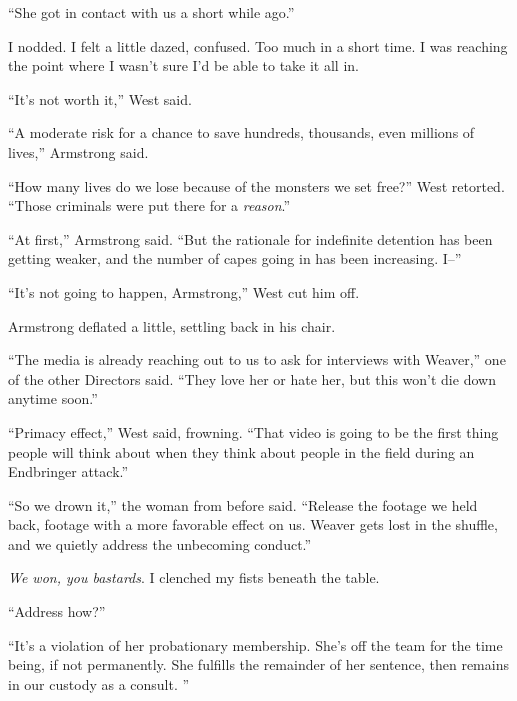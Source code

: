 ``She got in contact with us a short while ago.''



I nodded.  I felt a little dazed, confused.  Too much in a short time.  I was reaching the point where I wasn't sure I'd be able to take it all in.



``It's not worth it,'' West said.



``A moderate risk for a chance to save hundreds, thousands, even millions of lives,'' Armstrong said.



``How many lives do we lose because of the monsters we set free?''  West retorted.  ``Those criminals were put there for a \emph{reason}.''



``At first,'' Armstrong said.  ``But the rationale for indefinite detention has been getting weaker, and the number of capes going in has been increasing.  I--''



``It's not going to happen, Armstrong,'' West cut him off.



Armstrong deflated a little, settling back in his chair.



``The media is already reaching out to us to ask for interviews with Weaver,'' one of the other Directors said.  ``They love her or hate her, but this won't die down anytime soon.''



``Primacy effect,'' West said, frowning.  ``That video is going to be the first thing people will think about when they think about people in the field during an Endbringer attack.''



``So we drown it,'' the woman from before said.  ``Release the footage we held back, footage with a more favorable effect on us.  Weaver gets lost in the shuffle, and we quietly address the unbecoming conduct.''



\emph{We won, you bastards}.  I clenched my fists beneath the table.



``Address how?''



``It's a violation of her probationary membership.  She's off the team for the time being, if not permanently.  She fulfills the remainder of her sentence, then remains in our custody as a consult.  ''



